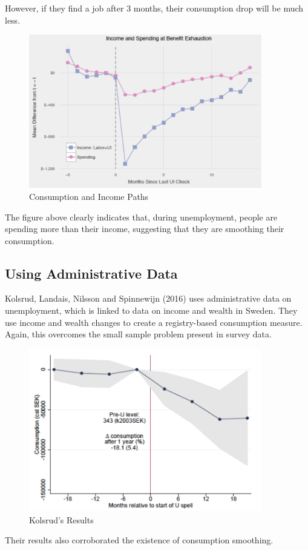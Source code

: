         However, if they find a job after 3 months, their consumption drop will be much less.
        \begin{figure}[H]
            \centering
            \includegraphics[width=4in]{images/ch1/Ganong_4.png}
            \caption{Consumption and Income Paths}
            \label{fig:Ganong_4}
        \end{figure}
        The figure above clearly indicates that, during unemployment, people are spending more than their income, suggesting that they are smoothing their consumption.
        
    \subsection{Using Administrative Data}
        Kolsrud, Landais, Nilsson and Spinnewijn (2016) uses administrative data on unemployment, which is linked to data on income and wealth in Sweden. They use income and wealth changes to create a registry-based consumption measure. Again, this overcomes the small sample problem present in survey data.
        \begin{figure}[H]
            \centering
            \includegraphics[width=4in]{images/ch1/Kolsrud_1.png}
            \caption{Kolsrud's Results}
            \label{fig:Kolsrudl}
        \end{figure}
        Their results also corroborated the existence of consumption smoothing.
        
